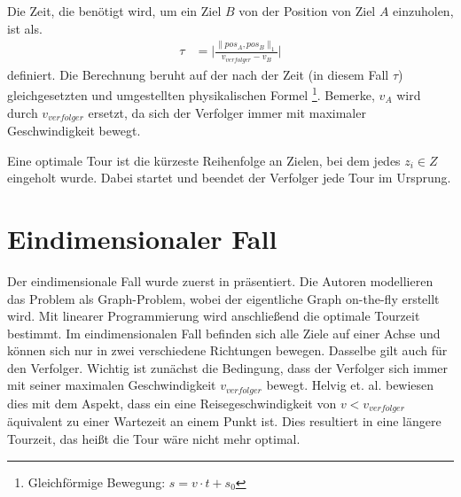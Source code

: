 \documentclass[german,version-2019-11]{uzl-thesis}
\begin{document}
\begin{definition}
\label{def:WegZeit}
Die Zeit, die benötigt wird, um ein Ziel $B$ von der Position von Ziel $A$ einzuholen, ist als. 
\begin{align*}
\tau &= \bigg\vert\frac{\|pos_A,pos_B\|_1}{v_{verfolger}-v_B}\bigg\vert
\end{align*} 
definiert.
Die Berechnung beruht auf der nach der Zeit (in diesem Fall $\tau$) gleichgesetzten und umgestellten physikalischen Formel \footnote{Gleichförmige Bewegung: $s=v\cdot t+s_0$}.
Bemerke, $v_A$ wird durch $v_{verfolger}$ ersetzt, da sich der Verfolger immer mit maximaler Geschwindigkeit bewegt.
\end{definition}

\begin{definition} 
Eine optimale Tour ist die kürzeste Reihenfolge an Zielen, bei dem jedes $z_i\in Z$ eingeholt wurde. Dabei startet und beendet der Verfolger jede Tour im Ursprung. 
\end{definition}

\section{Eindimensionaler Fall}
Der eindimensionale Fall wurde zuerst in \cite{helvig} präsentiert. Die Autoren modellieren das Problem als Graph-Problem, wobei der eigentliche Graph on-the-fly erstellt wird. Mit linearer Programmierung wird anschließend die optimale Tourzeit bestimmt.
Im eindimensionalen Fall befinden sich alle Ziele auf einer Achse und können sich nur in zwei verschiedene Richtungen bewegen. Dasselbe gilt auch für den Verfolger. Wichtig ist zunächst die Bedingung, dass der Verfolger sich immer mit seiner maximalen Geschwindigkeit $v_{verfolger}$ bewegt. Helvig et. al. bewiesen dies mit dem Aspekt, dass ein eine Reisegeschwindigkeit von $v<v_{verfolger}$ äquivalent zu einer Wartezeit an einem Punkt ist. Dies resultiert in eine längere Tourzeit, das heißt die Tour wäre nicht mehr optimal.
\end{document}
